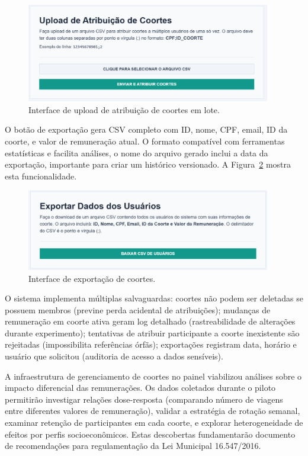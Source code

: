 \begin{figure}[H]
    \centering
    \includegraphics[width=0.95\textwidth]{figuras/upload_coortes.PNG}
    \caption{Interface de upload de atribuição de coortes em lote.}
    \label{fig:coortes_listagem_upload}
  \end{figure}

O botão de exportação gera CSV completo com ID, nome, CPF, email, ID da coorte, e valor de remuneração atual. O formato compatível com ferramentas estatísticas e facilita análises, o nome do arquivo gerado inclui a data da exportação, importante para criar um histórico versionado. A Figura~\ref{fig:coortes_listagem_exportar} mostra esta funcionalidade.

\begin{figure}[H]
    \centering
    \includegraphics[width=0.95\textwidth]{figuras/exportar_coortes.PNG}
    \caption{Interface de exportação de coortes.}
    \label{fig:coortes_listagem_exportar}
  \end{figure}

O sistema implementa múltiplas salvaguardas: coortes não podem ser deletadas se possuem membros (previne perda acidental de atribuições); mudanças de remuneração em coorte ativa geram log detalhado (rastreabilidade de alterações durante experimento); tentativas de atribuir participante a coorte inexistente são rejeitadas (impossibilita referências órfãs); exportações registram data, horário e usuário que solicitou (auditoria de acesso a dados sensíveis).

A infraestrutura de gerenciamento de coortes no painel viabilizou análises sobre o impacto diferencial das remunerações. Os dados coletados durante o piloto permitirão investigar relações dose-resposta (comparando número de viagens entre diferentes valores de remuneração), validar a estratégia de rotação semanal, examinar retenção de participantes em cada coorte, e explorar heterogeneidade de efeitos por perfis socioeconômicos. Estas descobertas fundamentarão documento de recomendações para regulamentação da Lei Municipal 16.547/2016.


